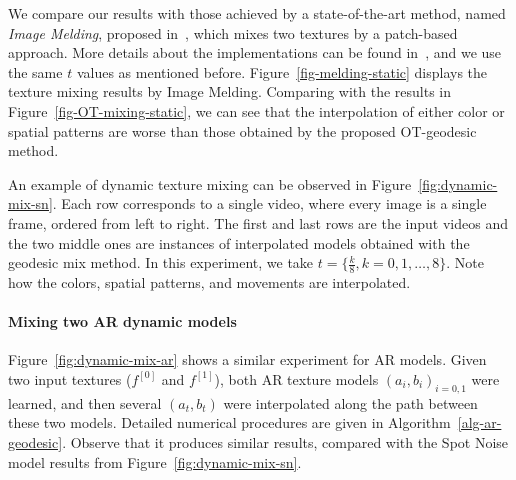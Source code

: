 We compare our results with those achieved by a state-of-the-art method, named \emph{Image Melding}, proposed in~\cite{ImageMelding12}, which mixes two textures by a patch-based approach. More details about the implementations can be found in~\cite{ImageMelding12}, and we use the same $t$ values as mentioned before.
Figure~\ref{fig-melding-static} displays the texture mixing results by Image Melding.
Comparing with the results in Figure~\ref{fig-OT-mixing-static}, we can see that the interpolation of either color or spatial patterns are worse than those obtained by the proposed OT-geodesic method.

An example of dynamic texture mixing can be observed in Figure~\ref{fig:dynamic-mix-sn}. Each row corresponds to a single video, where every image is a single frame, ordered from left to right. The first and last rows are the input videos and the two middle ones  are instances of interpolated models obtained with the geodesic mix method.
In this experiment, we take $t=\{ \frac{k}{8}, k=0,1,\ldots, 8 \}$.
Note how the colors, spatial patterns, and movements are interpolated.


\paragraph{Mixing two AR dynamic models}
Figure~\ref{fig:dynamic-mix-ar} shows a similar experiment for AR models. Given two input textures ($f^{[0]}$ and $f^{[1]}$), both AR texture models $(a_i, b_i)_{i=0,1}$ were learned, and then several $(a_t, b_t)$ were interpolated along the path between these two models.
Detailed numerical procedures are given in Algorithm~\ref{alg-ar-geodesic}. %
Observe that it produces similar results, compared with the Spot Noise model results from Figure~\ref{fig:dynamic-mix-sn}.


